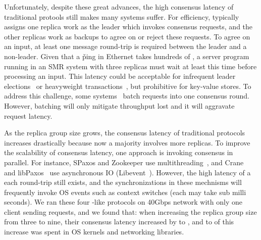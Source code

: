 Unfortunately, despite these great advances, the high consensus latency of 
traditional \paxos protools still makes many systems suffer. For efficiency, 
\paxos typically assigns one replica work as the leader which invokes consensus 
requests, and the other replicas work as backups to agree on or reject these 
requests. To agree on an input, at least one message round-trip 
is required between the leader and a non-leader. Given that a \v{ping} in 
Ethernet takes hundreds of \us, a server program running in an SMR 
system with three replicas must wait at least this time before processing an 
input. This latency could be acceptable for infrequent leader 
elections~\cite{chubby:osdi,zookeeper} or heavyweight 
transactions~\cite{crane:sosp15,eve:osdi12}, but prohibitive for key-value 
stores. To address this challenge, 
some systems~\cite{calvin:sigmod12,rex:eurosys14} batch requests into one 
consensus round. However, batching will only mitigate throughput lost and it 
will aggravate request latency. 


As the replica group size grows, the consensus latency of traditional \paxos 
protocols increases drastically because now a majority involves more replicas. 
To improve the scalability of consensus latency, one approach is invoking 
consensus in parallel. For instance, S\-Paxos and Zookeeper use 
multithreading~\cite{spaxos, zookeeper}, and Crane~\cite{crane:sosp15} and 
libPaxos~\cite{libpaxos} use asynchronous IO (Libevent~\cite{libevent}). 
However, the high latency of a each round-trip still exists, and the 
synchronizations in these mechnisms will frequently invoke OS events such as 
context switches (each may take sub milli seconds). We ran these four 
\paxos-like protocols on 40Gbps network with only one client sending requests, 
and we found that: when increasing the replica group size from three to nine, 
their consensus latency increased by \tradlatencyincreaselow to 
\tradlatencyincreasehigh, and \systemcostlow to \systemcosthigh of this 
increase was spent in OS kernels and networking libraries.

